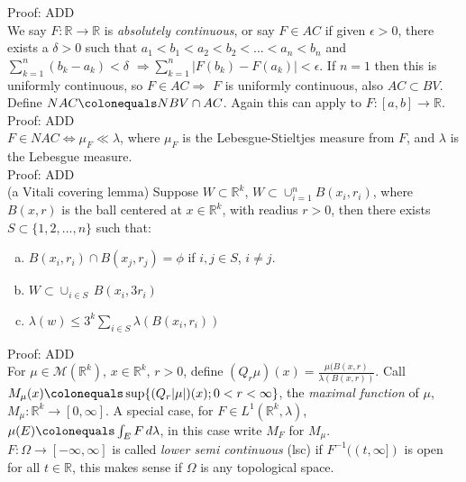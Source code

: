 \documentclass[12pt]{article}
\newcommand{\reals}[0] { \mathbb{R}}
\newcommand{\eps}[0] {  \epsilon }
\newcommand{\M}[0] { \mathcal{M} }
\newcommand{\Om}[0] { \Omega }
\newcommand{\rimply}[0] { \Rightarrow }
\newcommand{\lrimply}[0] { \Leftrightarrow }
\newcommand{\rarw}[0] { \rightarrow }
\newcommand{ \defeq }[0] { \colonequals }
\begin{document}
\noindent
Proof: ADD \\

We say $F: \reals \rarw \reals$ is \emph{absolutely continuous}, or say $F \in AC$ if given $\eps>0$, there exists a $\delta>0$ such that $a_1 < b_1 < a_2 < b_2 < ... < a_n < b_n$ and $\sum_{k=1}^n (b_k-a_k) < \delta$ $\rimply \sum_{k=1}^n |F(b_k) - F(a_k)| < \eps$. If $n=1$ then this is uniformly continuous, so $F \in AC \rimply$ $F$ is uniformly continuous, also $AC \subset BV$. Define $NAC \defeq NBV \cap AC$. Again this can apply to $F: [a,b] \rarw \reals$. \\

\noindent
Proof: ADD \\

$F \in NAC \lrimply \mu_F \ll \lambda$, where $\mu_F$ is the Lebesgue-Stieltjes measure from $F$, and $\lambda$ is the Lebesgue measure. \\


\noindent
Proof: ADD \\



(a Vitali covering lemma) Suppose $W \subset \reals^k$, $W \subset \cup_{i=1}^n B(x_i, r_i)$, where $B(x,r)$ is the ball centered at $x \in \reals^k$, with readius $r>0$, then there exists $S \subset \{ 1,2,...,n\}$ such that:

\begin{enumerate}[a)]
\item
$B(x_i, r_i) \cap B(x_j, r_j) = \phi$ if $i,j \in S$, $i \not = j$.
\item
$ W \subset \cup_{i \in S} \, B(x_i, 3 r_i)$
\item
$ \lambda(w) \le 3^k \sum_{i \in S} \lambda(B(x_i, r_i )) $
\end{enumerate}


\noindent
Proof: ADD \\


For $ \mu \in \M(\reals^k)$, $x \in \reals^k$, $r > 0$, define $(Q_r \mu)(x) = \frac{\mu(B(x,r)}{\lambda(B(x,r))}$. Call $ M_\mu(x) \defeq \sup \{ (Q_r|\mu|)(x); 0 < r < \infty \}$, the \emph{maximal function} of $\mu$, $M_\mu: \reals^k \rarw [0, \infty]$. A special case, for $F \in L^1(\reals^k, \lambda)$, $\mu(E) \defeq \int_E F \, d\lambda$, in this case write $M_F$ for $M_\mu$.  \\


$F: \Om \rarw [-\infty, \infty]$ is called \emph{lower semi continuous} (lsc) if $F^{-1}((t,\infty])$ is open for all $t \in \reals$, this makes sense if $\Om$ is any topological space. \\
\end{document}
